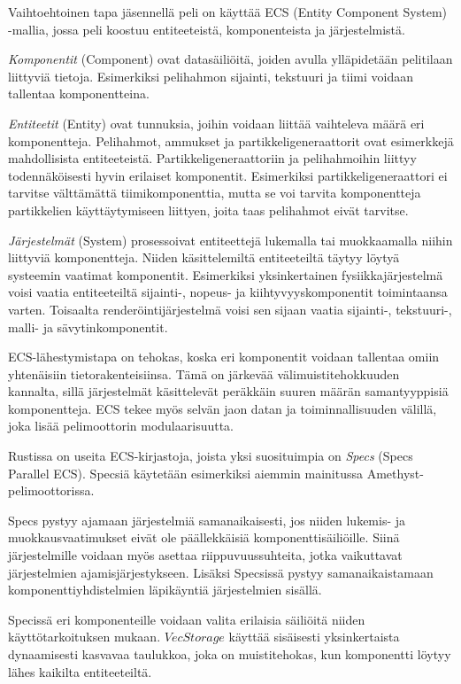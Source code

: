 \documentclass[finnish]{tktltiki2}
\theoremstyle{definition}
\theoremstyle{remark}
\begin{document}
Vaihtoehtoinen tapa jäsennellä peli on käyttää ECS (Entity Component System) -mallia, jossa peli koostuu entiteeteistä, komponenteista ja järjestelmistä.

\textit{Komponentit} (Component) ovat datasäiliöitä, joiden avulla ylläpidetään pelitilaan liittyviä tietoja. Esimerkiksi pelihahmon sijainti, tekstuuri ja tiimi voidaan tallentaa komponentteina.

\textit{Entiteetit} (Entity) ovat tunnuksia, joihin voidaan liittää vaihteleva määrä eri komponentteja. Pelihahmot, ammukset ja partikkeligeneraattorit ovat esimerkkejä mahdollisista entiteeteistä. Partikkeligeneraattoriin ja pelihahmoihin liittyy todennäköisesti hyvin erilaiset komponentit. Esimerkiksi partikkeligeneraattori ei tarvitse välttämättä tiimikomponenttia, mutta se voi tarvita komponentteja partikkelien käyttäytymiseen liittyen, joita taas pelihahmot eivät tarvitse.

\textit{Järjestelmät} (System) prosessoivat entiteettejä lukemalla tai muokkaamalla niihin liittyviä komponentteja. Niiden käsittelemiltä entiteeteiltä täytyy löytyä systeemin vaatimat komponentit. Esimerkiksi yksinkertainen fysiikkajärjestelmä voisi vaatia entiteeteiltä sijainti-, nopeus- ja kiihtyvyyskomponentit toimintaansa varten. Toisaalta renderöintijärjestelmä voisi sen sijaan vaatia sijainti-, tekstuuri-, malli- ja sävytinkomponentit.

ECS-lähestymistapa on tehokas, koska eri komponentit voidaan tallentaa omiin yhtenäisiin tietorakenteisiinsa. Tämä on järkevää välimuistitehokkuuden kannalta, sillä järjestelmät käsittelevät peräkkäin suuren määrän samantyyppisiä komponentteja. ECS tekee myös selvän jaon datan ja toiminnallisuuden välillä, joka lisää pelimoottorin modulaarisuutta.

Rustissa on useita ECS-kirjastoja, joista yksi suosituimpia on \textit{Specs} (Specs Parallel ECS)\cite{AreWeGameYetEcs}. Specsiä käytetään esimerkiksi aiemmin mainitussa Amethyst-pelimoottorissa. 

Specs pystyy ajamaan järjestelmiä samanaikaisesti, jos niiden lukemis- ja muokkausvaatimukset eivät ole päällekkäisiä komponenttisäiliöille. Siinä järjestelmille voidaan myös asettaa riippuvuussuhteita, jotka vaikuttavat järjestelmien ajamisjärjestykseen. Lisäksi Specsissä pystyy samanaikaistamaan komponenttiyhdistelmien läpikäyntiä järjestelmien sisällä.

Specissä eri komponenteille voidaan valita erilaisia säiliöitä niiden käyttötarkoituksen mukaan. $VecStorage$ käyttää sisäisesti yksinkertaista dynaamisesti kasvavaa taulukkoa, joka on muistitehokas, kun komponentti löytyy lähes kaikilta entiteeteiltä. 
\end{document}
